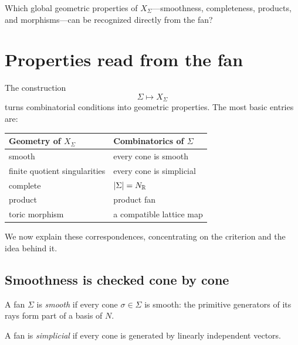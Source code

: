 \begin{guidingquestion}
Which global geometric properties of \(X_\Sigma\)—smoothness,
completeness, products, and morphisms—can be recognized directly from
the fan?
\end{guidingquestion}


\section{Properties read from the fan}
\label{sec:properties-read-from-fan}

The construction
\[
\Sigma\longmapsto X_\Sigma
\]
turns combinatorial conditions into geometric properties. The most
basic entries are:

\begin{center}
\small
\renewcommand{\arraystretch}{1.25}
\begin{tabularx}{0.92\linewidth}{@{}
  >{\raggedright\arraybackslash}X
  >{\raggedright\arraybackslash}X@{}}
\toprule
\textbf{Geometry of \(X_\Sigma\)}
&
\textbf{Combinatorics of \(\Sigma\)}
\\
\midrule
smooth
&
every cone is smooth
\\
finite quotient singularities
&
every cone is simplicial
\\
complete
&
\(|\Sigma|=N_{\mathbb{R}}\)
\\
product
&
product fan
\\
toric morphism
&
a compatible lattice map
\\
\bottomrule
\end{tabularx}
\end{center}

We now explain these correspondences, concentrating on the criterion
and the idea behind it.

\subsection{Smoothness is checked cone by cone}

\begin{definition}
A fan \(\Sigma\) is \emph{smooth} if every cone
\(\sigma\in\Sigma\) is smooth: the primitive generators of its rays
form part of a basis of \(N\).

A fan is \emph{simplicial} if every cone is generated by linearly
independent vectors.
\end{definition}

